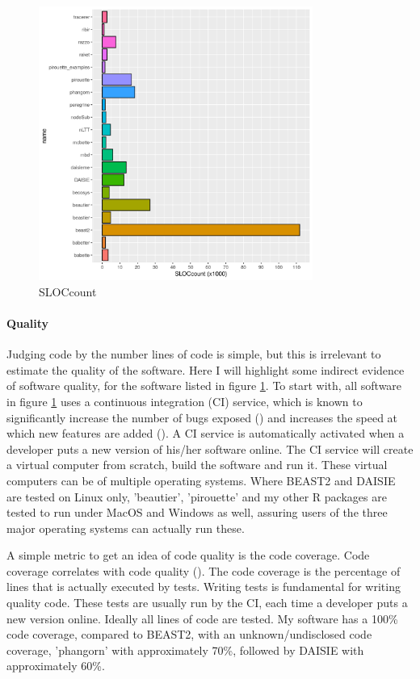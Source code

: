 \begin{figure}[]
  \includegraphics[width=0.8\textwidth]{sloccount.png}
  \caption{
    SLOCcount 
  }
  \label{fig:sloccount}
\end{figure}

\paragraph{Quality}

Judging code by the number lines of code is simple, but this is irrelevant 
to estimate the quality of the software.
Here I will highlight some indirect evidence of software quality,
for the software listed in figure \ref{fig:sloccount}.
To start with, all software in figure \ref{fig:sloccount} uses a
continuous integration (CI) service, which is known to significantly 
increase the number of bugs exposed (\cite{vasilescu2015}) and increases
the speed at which new features are added (\cite{vasilescu2015}).
A CI service is automatically activated when a developer puts a new version of
his/her software online. The CI service will create a virtual computer from
scratch, build the software and run it. These virtual computers can
be of multiple operating systems. 
Where BEAST2 and DAISIE are tested on Linux only, 'beautier',
'pirouette' and my other R packages are tested to run under MacOS and
Windows as well, assuring users of the three major operating systems
can actually run these.

A simple metric to get an idea of code quality is the code coverage.
Code coverage correlates with code quality (\cite{horgan1994,del1995correlation}). 
The code coverage is the percentage of lines
that is actually executed by tests. 
Writing tests is fundamental for writing quality code.
These tests are usually run by the CI, each time a developer puts a new version
online. Ideally all lines of code are tested. 
My software has a 100\% code coverage, compared to BEAST2, with an 
unknown/undisclosed code coverage, 'phangorn' with approximately
70\%, followed by DAISIE with approximately 60\%.

